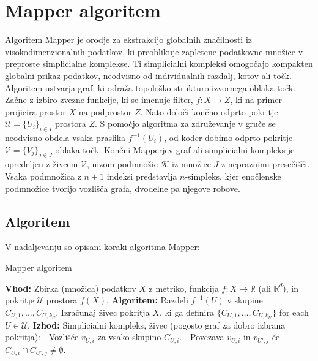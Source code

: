 \chapter{Mapper algoritem}
Algoritem Mapper je orodje za ekstrakcijo globalnih značilnosti iz visokodimenzionalnih podatkov, ki preoblikuje zapletene podatkovne množice v preproste simplicialne komplekse. Ti simplicialni kompleksi omogočajo kompakten globalni prikaz podatkov, neodvisno od individualnih razdalj, kotov ali točk.
Algoritem ustvarja graf, ki odraža topološko strukturo izvornega oblaka točk. Začne z izbiro zvezne funkcije, ki se imenuje filter, $f : X \rightarrow Z$, ki na primer projicira prostor $X$ na podprostor $Z$. Nato določi končno odprto pokritje $\mathcal{U} = \{U_i\}_{i \in I}$ prostora $Z$. S pomočjo algoritma za združevanje v gruče se neodvisno obdela vsaka praslika $f^{-1}(U_i)$, od koder dobimo odprto pokritje $\mathcal{V} = \{V_j\}_{j \in J}$ oblaka točk. Končni Mapperjev graf ali simplicialni kompleks je opredeljen z živcem $\mathcal{V}$, nizom podmnožic $\mathcal{K}$ iz množice $J$ z nepraznimi presečišči. Vsaka podmnožica z $n+1$ indeksi predstavlja $n$-simpleks, kjer enočlenske podmnožice tvorijo vozlišča grafa, dvodelne pa njegove robove.
\begin{comment}
https://danedmiston.github.io/home_page/assets/Mapper.pdf
\end{comment}

\cite{Langenbahn2022}
\section{Algoritem}
V nadaljevanju so opisani koraki algoritma Mapper:
\begin{algorithm}
  \caption{Mapper algoritem}\label{alg:cap}
  \begin{algorithmic}
    \State \textbf{Vhod:} Zbirka (množica) podatkov $X$ z metriko, funkcija $f: X \rightarrow \mathbb{R}$ (ali $\mathbb{R}^d$), in pokritje $\mathcal{U}$ prostora $f(X)$.
    \State \textbf{Algoritem:}
    \State Razdeli $f^{-1}(U)$  v skupine $C_{U,1}, \ldots, C_{U,k_U}$.
    \State Izračunaj živec pokritja $X$, ki ga definira $\{C_{U,1}, \ldots, C_{U,k_U}\}$ for each $U \in \mathcal{U}$.
    \EndFor
    \State \textbf{Izhod:} Simplicialni kompleks, živec (pogosto graf za dobro izbrana pokritja):
    \State \quad - Vozlišče $v_{U,i}$ za vsako skupino $C_{U,i}$.
    \State \quad - Povezava $v_{U,i}$ in $v_{U',j}$ če $C_{U,i} \cap C_{U',j} \neq \emptyset$.
  \end{algorithmic}
\end{algorithm}
